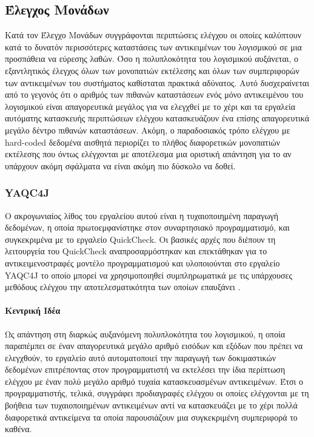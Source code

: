 \documentclass[12pt]{article}
\begin{document}
\subsection{Έλεγχος Μονάδων}
Κατά τον Έλεγχο Μονάδων συγγράφονται περιπτώσεις ελέγχου οι οποίες καλύπτουν κατά το δυνατόν περισσότερες καταστάσεις των αντικειμένων του λογισμικού σε μια προσπάθεια να εύρεσης λαθών. Όσο η πολυπλοκότητα του λογισμικού αυξάνεται, ο εξαντλητικός έλεγχος όλων των μονοπατιών εκτέλεσης και όλων των συμπεριφορών των αντικειμένων του συστήματος καθίσταται πρακτικά αδύνατος. Αυτό δυσχεραίνεται από το γεγονός ότι ο αριθμός των πιθανών καταστάσεων ενός μόνο αντικειμένου του λογισμικού είναι απαγορευτικά μεγάλος για να ελεγχθεί με το χέρι και τα εργαλεία αυτόματης κατασκευής περιπτώσεων ελέγχου κατασκευάζουν ένα επίσης απαγορευτικά μεγάλο δέντρο πιθανών καταστάσεων. Ακόμη, ο παραδοσιακός τρόπο ελέγχου με hard-coded δεδομένα αισθητά περιορίζει το πλήθος διαφορετικών μονοπατιών εκτέλεσης που όντως ελέγχονται με αποτέλεσμα μια οριστική απάντηση για το αν υπάρχουν ακόμη σφάλματα να είναι ακόμη πιο δύσκολο να δοθεί.

\subsubsection{YAQC4J}

Ο ακρογωνιαίος λίθος του εργαλείου αυτού είναι η τυχαιοποιημένη παραγωγή δεδομένων, η οποία πρωτοεμφανίστηκε στον συναρτησιακό προγραμματισμό, και συγκεκριμένα με το εργαλείο QuickCheck. Οι βασικές αρχές που διέπουν τη λειτουργεία του QuickCheck αναπροσαρμόστηκαν και επεκτάθηκαν για το αντικειμενοστραφές μοντέλο προγραμματισμού και υλοποιούνται στο εργαλείο YAQC4J το οποίο μπορεί να χρησιμοποιηθεί συμπληρωματικά με τις υπάρχουσες μεθόδους ελέγχου την αποτελεσματικότητα των οποίων επαυξάνει \cite{andres}.

\paragraph{Κεντρική Ιδέα}

Ως απάντηση στη διαρκώς αυξανόμενη πολυπλοκότητα του λογισμικού, η οποία παραπέμπει σε έναν απαγορευτικά μεγάλο αριθμό εισόδων και εξόδων που πρέπει να ελεγχθούν, το εργαλείο αυτό αυτοματοποιεί την παραγωγή των δοκιμαστικών δεδομένων επιτρέποντας στον προγραμματιστή να εκτελέσει την ίδια περίπτωση ελέγχου με έναν πολύ μεγάλο αριθμό τυχαία κατασκευασμένων αντικειμένων. Έτσι ο προγραμματιστής, τελικά, συγγράφει προδιαγραφές ελέγχου οι οποίες ελέγχονται με τη βοήθεια των τυχαιοποιημένων αντικειμένων αντί να κατασκευάζει με το χέρι πολλά διαφορετικά αντικείμενα τα οποία παρουσιάζουν μια συγκεκριμένη συμπεριφορά το καθένα.
\end{document}
